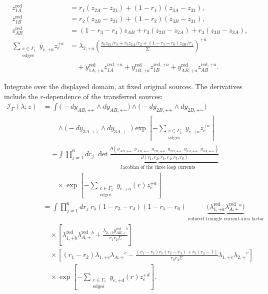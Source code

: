 \documentclass[11pt]{article}
\numberwithin{equation}{section}
\numberwithin{figure}{section}
\numberwithin{table}{section}
\begin{document}
\begin{equation*}
\begin{aligned}
z^{\mathrm{red}}_{1A}&=r_1(z_{2A}-z_{21})+(1-r_1)(z_{3A}-z_{31}),\\
z^{\mathrm{red}}_{1B}&=r_2(z_{2B}-z_{21})+(1-r_2)(z_{3B}-z_{31}),\\
z^{\mathrm{red}}_{AB}&=(1-r_3-r_4)z_{AB}+r_3(z_{2B}-z_{2A})+r_4(z_{3B}-z_{3A}),\\
\sum_{\substack{e\in\Gamma_1\\\mathrm{edges}}}y_{e,+\dot a}z_e^{+\dot a}
&=\lambda_{2,+\dot a}\left(\frac{r_6z_{21}/r_3+r_5z_{2A}/r_2+(1-r_5-r_6)z_{2B}/r_1}{\Sigma}\right)^{+\dot a}\\
&\quad+y^{\mathrm{red}}_{1A,+\dot a}z^{\mathrm{red},+\dot a}_{1A}
+y^{\mathrm{red}}_{1B,+\dot a}z^{\mathrm{red},+\dot a}_{1B}
+y^{\mathrm{red}}_{AB,+\dot a}z^{\mathrm{red},+\dot a}_{AB}.
\end{aligned}
\end{equation*}

Integrate over the displayed domain, at fixed original sources. The derivatives include the $r$-dependence of the transferred sources:
\begin{equation*}
\begin{aligned}
\mathcal I_\Gamma(\lambda;z)
&=\int
\bigl(-dy_{AB,+\dot+}\wedge dy_{AB,+\dot-}\bigr)
\wedge\bigl(-dy_{2B,+\dot+}\wedge dy_{2B,+\dot-}\bigr)\\
&\qquad\wedge\bigl(-dy_{3A,+\dot+}\wedge dy_{3A,+\dot-}\bigr)
\exp\!\left[-\sum_{\substack{e\in\Gamma_1\\\mathrm{edges}}}y_{e,+\dot a}z_e^{+\dot a}\right]\\
&=-\int\prod_{j=1}^{6}dr_j\;
\underbrace{\det\frac{\partial(y_{AB,+\dot+},y_{AB,+\dot-},y_{2B,+\dot+},y_{2B,+\dot-},y_{3A,+\dot+},y_{3A,+\dot-})}{\partial(r_1,r_2,r_3,r_4,r_5,r_6)}}_{\text{Jacobian of the three loop currents}}\\
&\qquad\times\exp\!\left[-\sum_{\substack{e\in\Gamma_1\\\mathrm{edges}}}y_{e,+\dot a}(r)z_e^{+\dot a}\right]\\
&=\int\prod_{j=1}^{6}dr_j\;r_5(1-r_3-r_4)(1-r_5-r_6)\,
\underbrace{\bigl(\lambda^{\mathrm{red}}_{1,+\dot a}\lambda^{\mathrm{red}}_{A,+}{}^{\dot a}\bigr)}_{\text{reduced triangle current-area factor}}\\
&\quad\times\left[\lambda^{\mathrm{red}}_{1,+\dot b}\lambda^{\mathrm{red}}_{A,+}{}^{\dot b}
+\frac{\lambda_{2,+\dot b}y^{\mathrm{red}}_{AB,+}{}^{\dot b}}{r_1r_2\Sigma}\right]\\
&\quad\times\left[(r_1-r_2)\lambda_{1,+\dot c}\lambda_{A,+}{}^{\dot c}
-\frac{(r_1-r_2)r_5(r_2-r_3)+r_2(r_2-1)}{r_2r_3\Sigma}
\lambda_{1,+\dot c}\lambda_{2,+}{}^{\dot c}\right]\\
&\quad\times\exp\!\left[-\sum_{\substack{e\in\Gamma_1\\\mathrm{edges}}}y_{e,+\dot d}(r)z_e^{+\dot d}\right].
\end{aligned}
\end{equation*}
\end{document}
